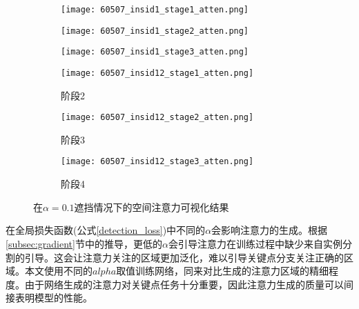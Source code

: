 \begin{figure}[h]
	\centering
	\begin{minipage}{\textwidth}
		\centering
		\begin{subfigure}{0.23\linewidth}
			\texttt{[image: 60507\_insid1\_stage1\_atten.png]}
		\end{subfigure}
		\begin{subfigure}{0.23\linewidth}
			\texttt{[image: 60507\_insid1\_stage2\_atten.png]}
		\end{subfigure}
		\begin{subfigure}{0.23\linewidth}
			\texttt{[image: 60507\_insid1\_stage3\_atten.png]}
		\end{subfigure}
		\begin{sideways}
			\begin{minipage}{1cm}
			\end{minipage}
		\end{sideways}
	\end{minipage}
	
	\vskip2pt
	\begin{minipage}{\textwidth}
		\centering
		\begin{subfigure}{0.23\linewidth}
			\texttt{[image: 60507\_insid12\_stage1\_atten.png]}
			\caption{阶段2}
		\end{subfigure}
		\begin{subfigure}{0.23\linewidth}
			\texttt{[image: 60507\_insid12\_stage2\_atten.png]}
			\caption{阶段3}
		\end{subfigure}
		\begin{subfigure}{0.23\linewidth}
			\texttt{[image: 60507\_insid12\_stage3\_atten.png]}
			\caption{阶段4}
		\end{subfigure}
		\begin{sideways}
			\begin{minipage}{1cm}
				\rightline{被遮挡人}
			\end{minipage}
		\end{sideways}
	\end{minipage}
	\caption{在$\alpha=0.1$遮挡情况下的空间注意力可视化结果}
	\label{fig:attenvis}
\end{figure}

在全局损失函数(公式\eqref{detection_loss})中不同的$\alpha$会影响注意力的生成。根据\ref{subsec:gradient}节中的推导，更低的$\alpha$会引导注意力在训练过程中缺少来自实例分割的引导。这会让注意力关注的区域更加泛化，难以引导关键点分支关注正确的区域。本文使用不同的$alpha$取值训练网络，同来对比生成的注意力区域的精细程度。由于网络生成的注意力对关键点任务十分重要，因此注意力生成的质量可以间接表明模型的性能。


